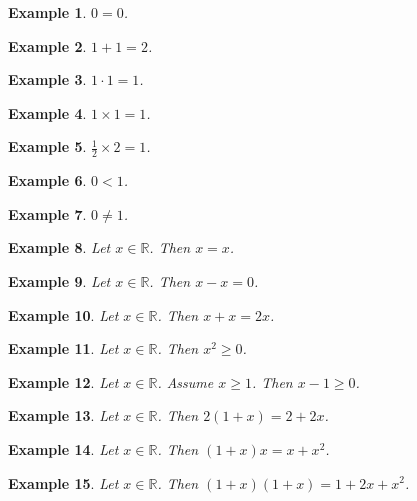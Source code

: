 \documentclass{article}
\newtheorem{example}{Example}
\begin{document}
\begin{example}
$0=0$.
\end{example}

\begin{example}
$1+1=2$.
\end{example}

\begin{example}
$1\cdot 1=1$.
\end{example}

\begin{example}
$1\times 1=1$.
\end{example}

\begin{example}
$\frac{1}{2}\times 2=1$.
\end{example}

\begin{example}
$0<1$.
\end{example}

\begin{example}
$0\ne 1$.
\end{example}

\begin{example}
Let $x\in\mathbb{R}$. Then $x=x$.
\end{example}

\begin{example}
Let $x\in\mathbb{R}$. Then $x-x=0$.
\end{example}

\begin{example}
Let $x\in\mathbb{R}$. Then $x+x=2x$.
\end{example}

\begin{example}
Let $x\in\mathbb{R}$. Then $x^2\geq 0$.
\end{example}

\begin{example}
Let $x\in\mathbb{R}$. Assume $x\geq 1$. Then $x-1\geq 0$.
\end{example}

\begin{example}
Let $x\in\mathbb{R}$. Then $2(1+x)=2+2x$.
\end{example}

\begin{example}
Let $x\in\mathbb{R}$. Then $(1+x)x=x+x^2$.
\end{example}

\begin{example}
Let $x\in\mathbb{R}$. Then $(1+x)(1+x)=1+2x+x^2$.
\end{example}
\end{document}
